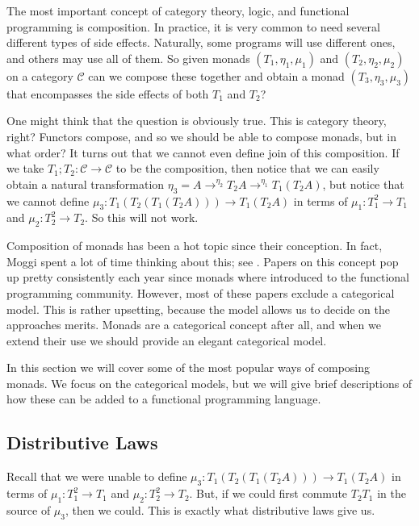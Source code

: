 \documentclass{article}
\let\mto\to
\let\to\relax
\newcommand{\to}{\rightarrow}
\newcommand{\cat}[1]{\mathcal{#1}}
\begin{document}
The most important concept of category theory, logic, and functional
programming is composition.  In practice, it is very common to need
several different types of side effects.  Naturally, some programs
will use different ones, and others may use all of them.  So given
monads $(T_1,\eta_1,\mu_1)$ and $(T_2,\eta_2,\mu_2)$ on a category
$\cat{C}$ can we compose these together and obtain a monad
$(T_3,\eta_3,\mu_3)$ that encompasses the side effects of both $T_1$
and $T_2$?

One might think that the question is obviously true.  This is category
theory, right?  Functors compose, and so we should be able to compose
monads, but in what order?  It turns out that we cannot even define
join of this composition.  If we take $T_1;T_2 : \cat{C} \mto \cat{C}$
to be the composition, then notice that we can easily obtain a natural
transformation $\eta_3 = A \mto^{\eta_2} T_2 A \mto^{\eta_1} T_1(T_2
A)$, but notice that we cannot define $\mu_3 : T_1(T_2(T_1(T_2 A)))
\mto T_1(T_2 A)$ in terms of $\mu_1 : T^2_1 \mto T_1$ and $\mu_2 :
T^2_2 \mto T_2$.  So this will not work.  

Composition of monads has been a hot topic since their conception.  In
fact, Moggi spent a lot of time thinking about this; see
\cite{Moggi:1989a}. Papers on this concept pop up pretty consistently
each year since monads where introduced to the functional programming
community.  However, most of these papers exclude a categorical model.
This is rather upsetting, because the model allows us to decide on the
approaches merits.  Monads are a categorical concept after all, and
when we extend their use we should provide an elegant categorical
model.

In this section we will cover some of the most popular ways of
composing monads. We focus on the categorical models, but we will give
brief descriptions of how these can be added to a functional
programming language.

\subsection{Distributive Laws}
\label{subsec:distributive_laws}
Recall that we were unable to define $\mu_3 : T_1(T_2(T_1(T_2 A)))
\mto T_1(T_2 A)$ in terms of $\mu_1 : T^2_1 \mto T_1$ and $\mu_2 :
T^2_2 \mto T_2$.  But, if we could first commute $T_2T_1$ in the
source of $\mu_3$, then we could.  This is exactly what distributive
laws give us.
\end{document}
